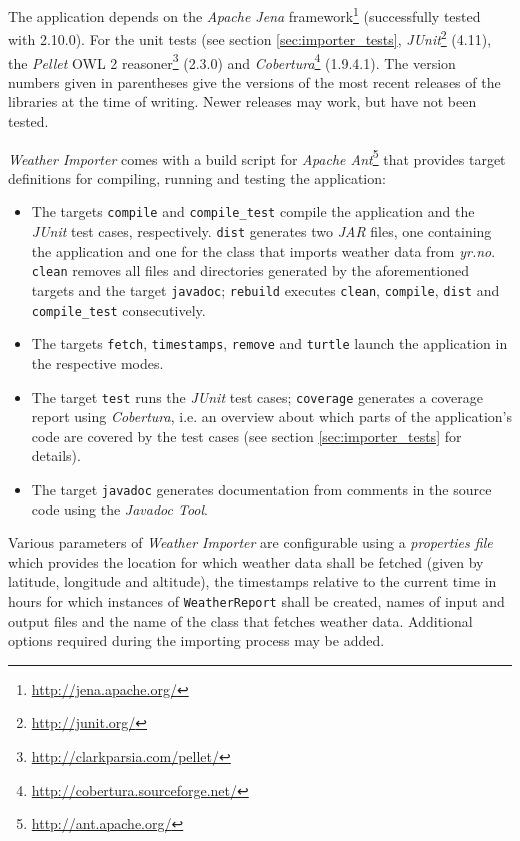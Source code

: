The application depends on the \emph{Apache Jena} framework\footnote{\href{http://jena.apache.org/}{http://jena.apache.org/}} (successfully tested with 2.10.0). For the unit tests (see section \ref{sec:importer_tests}, \emph{JUnit}\footnote{\href{http://junit.org/}{http://junit.org/}} (4.11), the \emph{Pellet} OWL 2 reasoner\footnote{\href{http://clarkparsia.com/pellet/}{http://clarkparsia.com/pellet/}} (2.3.0) and \emph{Cobertura}\footnote{\href{http://cobertura.sourceforge.net/}{http://cobertura.sourceforge.net/}} (1.9.4.1). The version numbers given in parentheses give the versions of the most recent releases of the libraries at the time of writing. Newer releases may work, but have not been tested.

\emph{Weather Importer} comes with a build script for \emph{Apache Ant}\footnote{\href{http://ant.apache.org/}{http://ant.apache.org/}} that provides target definitions for compiling, running and testing the application:

\begin{itemize}
  \item The targets \texttt{compile} and \texttt{compile\_test} compile the application and the \emph{JUnit} test cases, respectively. \texttt{dist} generates two \emph{JAR} files, one containing the application and one for the class that imports weather data from \emph{yr.no}. \texttt{clean} removes all files and directories generated by the aforementioned targets and the target \texttt{javadoc}; \texttt{rebuild} executes \texttt{clean}, \texttt{compile}, \texttt{dist} and \texttt{compile\_test} consecutively.
  \item The targets \texttt{fetch}, \texttt{timestamps}, \texttt{remove} and \texttt{turtle} launch the application in the respective modes.
  \item The target \texttt{test} runs the \emph{JUnit} test cases; \texttt{coverage} generates a coverage report using \emph{Cobertura}, i.e. an overview about which parts of the application's code are covered by the test cases (see section \ref{sec:importer_tests} for details).
  \item The target \texttt{javadoc} generates documentation from comments in the source code using the \emph{Javadoc Tool}.
\end{itemize}

Various parameters of \emph{Weather Importer} are configurable using a \emph{properties file} which provides the location for which weather data shall be fetched (given by latitude, longitude and altitude), the timestamps relative to the current time in hours for which instances of \texttt{WeatherReport} shall be created, names of input and output files and the name of the class that fetches weather data. Additional options required during the importing process may be added.


